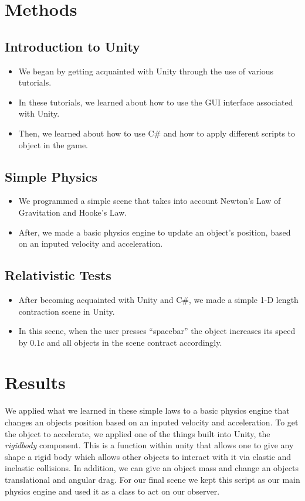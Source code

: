 \documentclass[12pt]{article}
\begin{document}
\section*{Methods}
\subsection*{Introduction to Unity}
\begin{itemize}
	\item We began by getting acquainted with Unity through the use of various tutorials.
	\item In these tutorials, we learned about how to use the GUI interface associated with Unity.
	\item Then, we learned about how to use C\# and how to apply different scripts to object in the game.
\end{itemize}

\subsection*{Simple Physics}
\begin{itemize}
	\item We programmed a simple scene that takes into account Newton's Law of Gravitation and Hooke's Law.
	\item After, we made a basic physics engine to update an object's position, based on an inputed velocity and acceleration.
\end{itemize}

\subsection*{Relativistic Tests}
\begin{itemize}
	\item After becoming acquainted with Unity and C\#, we made a simple 1-D length contraction scene in Unity. 
	\item In this scene, when the user presses ``spacebar'' the object increases its speed by $0.1c$ and all objects in the scene contract accordingly.
\end{itemize}

\section*{Results}
We applied what we learned in these simple laws to a basic physics engine that changes an objects position based on an inputed velocity and acceleration. To get the object to accelerate, we applied one of the things built into Unity, the \textit{rigidbody} component. This is a function within unity that allows one to give any shape a rigid body which allows other objects to interact with it via elastic and inelastic collisions. In addition, we can give an object mass and change an objects translational and angular drag. For our final scene we kept this script as our main physics engine and used it as a class to act on our observer. 
\end{document}
